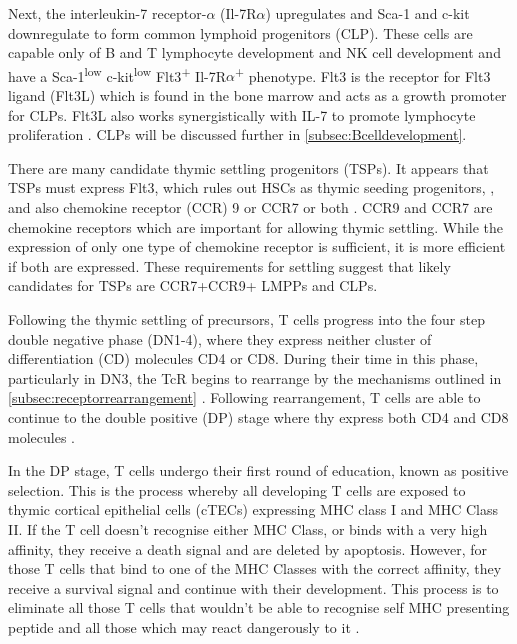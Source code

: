 Next, the interleukin-7 receptor-$\alpha$ (Il-7R$\alpha$) upregulates and Sca-1 and c-kit downregulate to form common lymphoid progenitors (CLP).
These cells are capable only of B and T lymphocyte development and NK cell development \citep{Kondo1997} and have a Sca-1\textsuperscript{low} c-kit\textsuperscript{low} Flt3\textsuperscript{+} Il-7R$\alpha$\textsuperscript{+} phenotype.
Flt3 is the receptor for Flt3 ligand (Flt3L) which is found in the bone marrow and acts as a growth promoter for CLPs.
Flt3L also works synergistically with IL-7 to promote lymphocyte proliferation \citep{Holmes2006}.
CLPs will be discussed further in \cref{subsec:Bcelldevelopment}.


There are many candidate thymic settling progenitors (TSPs).
It appears that TSPs must express Flt3, which rules out HSCs as thymic seeding progenitors, \citep{Zlotoff2011}, and also chemokine receptor (CCR) 9 or CCR7 or both \citep{Zlotoff2010}.
CCR9 and CCR7 are chemokine receptors which are important for allowing thymic settling. 
While the expression of only one type of chemokine receptor is sufficient, it is more efficient if both are expressed.
These requirements for settling suggest that likely candidates for TSPs are CCR7+CCR9+ LMPPs and CLPs\citep{Zlotoff2011}.

Following the thymic settling of precursors, T cells progress into the four step double negative phase (DN1-4), where they express neither cluster of differentiation (CD) molecules CD4 or CD8.
During their time in this phase, particularly in DN3, the TcR begins to rearrange by the mechanisms outlined in \cref{subsec:receptorrearrangement} \citep{Starr2003}.
Following rearrangement, T cells are able to continue to the double positive (DP) stage where thy express both CD4 and CD8 molecules \citep{Zuniga1996}.


In the DP stage, T cells undergo their first round of education, known as positive selection.
This is the process whereby all developing T cells are exposed to thymic cortical epithelial cells (cTECs) expressing MHC class I and MHC Class II.
If the T cell doesn't recognise either MHC Class, or binds with a very high affinity, they receive a death signal and are deleted by apoptosis.
However, for those T cells that bind to one of the MHC Classes with the correct affinity, they receive a survival signal and continue with their development.
This process is to eliminate all those T cells that wouldn't be able to recognise self MHC presenting peptide and all those which  may react dangerously to it \citep{Jameson1998, Starr2003}.

